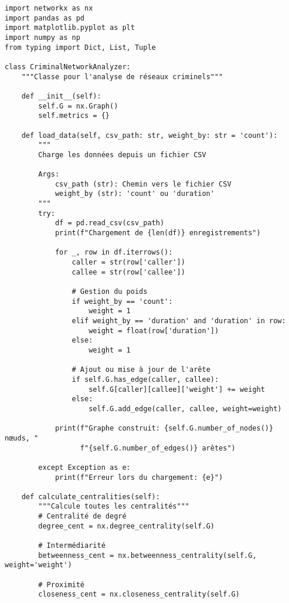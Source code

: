 \documentclass[12pt,a4paper]{article}
\begin{document}
\begin{lstlisting}[caption=Analyse de réseau criminel avec NetworkX]
import networkx as nx
import pandas as pd
import matplotlib.pyplot as plt
import numpy as np
from typing import Dict, List, Tuple

class CriminalNetworkAnalyzer:
    """Classe pour l'analyse de réseaux criminels"""
    
    def __init__(self):
        self.G = nx.Graph()
        self.metrics = {}
    
    def load_data(self, csv_path: str, weight_by: str = 'count'):
        """
        Charge les données depuis un fichier CSV
        
        Args:
            csv_path (str): Chemin vers le fichier CSV
            weight_by (str): 'count' ou 'duration'
        """
        try:
            df = pd.read_csv(csv_path)
            print(f"Chargement de {len(df)} enregistrements")
            
            for _, row in df.iterrows():
                caller = str(row['caller'])
                callee = str(row['callee'])
                
                # Gestion du poids
                if weight_by == 'count':
                    weight = 1
                elif weight_by == 'duration' and 'duration' in row:
                    weight = float(row['duration'])
                else:
                    weight = 1
                
                # Ajout ou mise à jour de l'arête
                if self.G.has_edge(caller, callee):
                    self.G[caller][callee]['weight'] += weight
                else:
                    self.G.add_edge(caller, callee, weight=weight)
                    
            print(f"Graphe construit: {self.G.number_of_nodes()} nœuds, "
                  f"{self.G.number_of_edges()} arêtes")
                  
        except Exception as e:
            print(f"Erreur lors du chargement: {e}")
    
    def calculate_centralities(self):
        """Calcule toutes les centralités"""
        # Centralité de degré
        degree_cent = nx.degree_centrality(self.G)
        
        # Intermédiarité
        betweenness_cent = nx.betweenness_centrality(self.G, weight='weight')
        
        # Proximité
        closeness_cent = nx.closeness_centrality(self.G)
        

\end{lstlisting}
\end{document}
